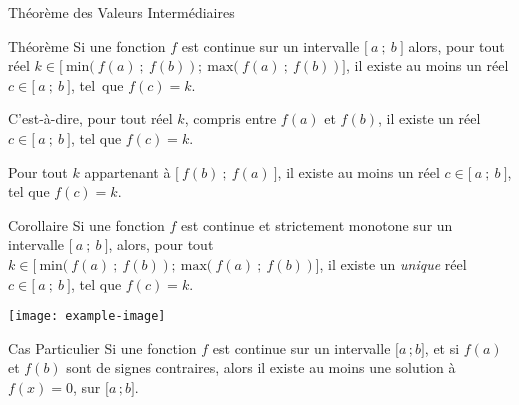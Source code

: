 \documentclass{cours}
\begin{document}
    \begin{Gpartie}{Théorème des Valeurs Intermédiaires}
        \begin{Spartie}{Théorème}
            Si une fonction $f$ est continue sur un intervalle $\big[~a~;~b~\big]$ alors, pour tout réel $k\in\Big[~\text{min}\big(~f(a)~;~f(b)~\big)~;~\text{max}\big(~f(a)~;~f(b)~\big)~\Big]$, il existe au moins un réel $c\in\big[~a~;~b~\big]$, tel~que $f(c)=k$.

            C'est-à-dire, pour tout réel $k$, compris entre $f(a)$ et $f(b)$, il existe un réel $c\in\big[~a~;~b~\big]$, tel que $f(c)=k$.
            \begin{center}
                \parbox{\linewidth}{}
            \end{center}
            Pour tout $k$ appartenant à $\big[~f(b)~;~f(a)~\big]$, il existe au moins un réel $c\in\big[~a~;~b~\big]$, tel que $f(c)=k$.
        \end{Spartie}
        \begin{Spartie}{Corollaire}
            Si une fonction $f$ est continue et strictement monotone sur un intervalle $\big[~a~;~b~\big]$, alors, pour tout $k\in\Big[~\text{min}\big(~f(a)~;~f(b)~\big)~;~\text{max}\big(~f(a)~;~f(b)~\big)~\Big]$, il existe un \textit{unique} réel $c\in\big[~a~;~b~\big]$, tel que $f(c)=k$. 
            \begin{center}
                    \noindent\texttt{[image: example-image]}
                    \parbox{\linewidth}{}
            \end{center}
            \begin{SSpartie}{Cas Particulier}
                Si une fonction $f$ est continue sur un intervalle $\big[a\,;b\big]$, et si $f(a)$ et $f(b)$ sont de signes contraires, alors il existe au moins une solution à $f(x)=0$, sur $\big[a\,;b\big]$.
            \end{SSpartie}
        \end{Spartie}
    \end{Gpartie}
\end{document}
